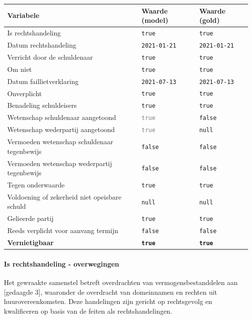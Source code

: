 \documentclass[
  dutch,
  a4paper,
]{article}
\begin{document}
\begin{center}
\small
\begin{tabular}{@{}p{7.4cm}p{2.6cm}p{2.6cm}@{}}
\toprule
Variabele & Waarde (model) & Waarde (gold) \\
\midrule
Is rechtshandeling & \texttt{true} & \texttt{true} \\
Datum rechtshandeling & \texttt{2021-01-21} & \texttt{2021-01-21} \\
Verricht door de schuldenaar & \texttt{true} & \texttt{true} \\
Om niet & \texttt{true} & \texttt{true} \\
Datum faillietverklaring & \texttt{2021-07-13} & \texttt{2021-07-13} \\
Onverplicht & \texttt{true} & \texttt{true} \\
Benadeling schuldeisers & \texttt{true} & \texttt{true} \\
Wetenschap schuldenaar aangetoond & \textcolor{gray}{\texttt{true}} & \texttt{false} \\
Wetenschap wederpartij aangetoond & \textcolor{gray}{\texttt{true}} & \texttt{null} \\
Vermoeden wetenschap schuldenaar tegenbewijs & \texttt{false} & \texttt{false} \\
Vermoeden wetenschap wederpartij tegenbewijs & \texttt{false} & \texttt{false} \\
Tegen onderwaarde & \texttt{true} & \texttt{true} \\
Voldoening of zekerheid niet opeisbare schuld & \texttt{null} & \texttt{null} \\
Gelieerde partij & \texttt{true} & \texttt{true} \\
Reeds verplicht voor aanvang termijn & \texttt{false} & \texttt{false} \\
\textbf{Vernietigbaar} & \textbf{\texttt{true}} & \textbf{\texttt{true}} \\
\bottomrule
\end{tabular}
\end{center}

\paragraph{Is rechtshandeling - overwegingen}\label{is-rechtshandeling---overwegingen-22}

Het gewraakte samenstel betreft overdrachten van vermogensbestanddelen aan {[}gedaagde 3{]}, waaronder de overdracht van domeinnamen en rechten uit huurovereenkomsten. Deze handelingen zijn gericht op rechtsgevolg en kwalificeren op basis van de feiten als rechtshandelingen.
\end{document}
